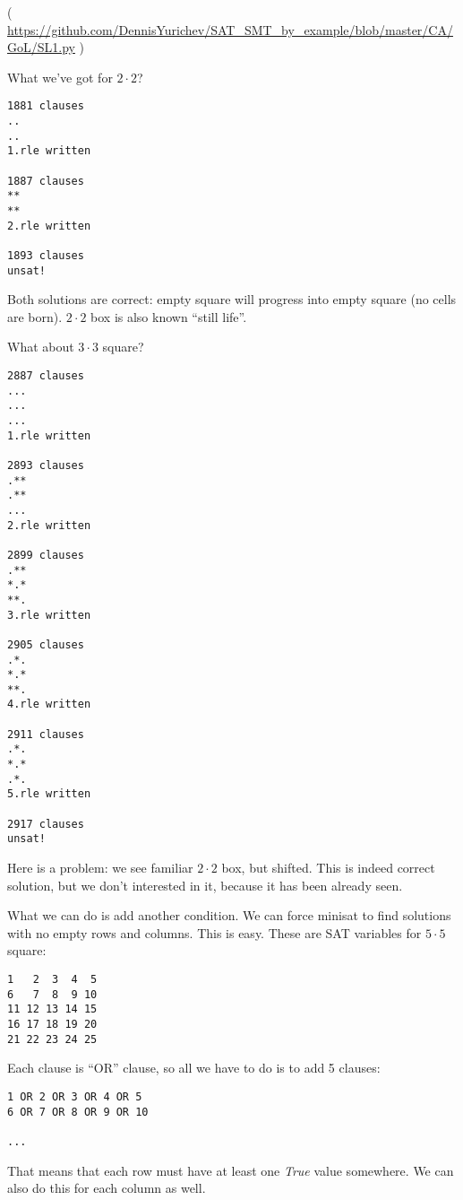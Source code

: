 

( \url{https://github.com/DennisYurichev/SAT_SMT_by_example/blob/master/CA/GoL/SL1.py} )

What we've got for $2 \cdot 2$?

\begin{lstlisting}
1881 clauses
..
..
1.rle written

1887 clauses
**
**
2.rle written

1893 clauses
unsat!
\end{lstlisting}

Both solutions are correct: empty square will progress into empty square (no cells are born).
$2 \cdot 2$ box is also known ``still life''.

What about $3 \cdot 3$ square?

\begin{lstlisting}
2887 clauses
...
...
...
1.rle written

2893 clauses
.**
.**
...
2.rle written

2899 clauses
.**
*.*
**.
3.rle written

2905 clauses
.*.
*.*
**.
4.rle written

2911 clauses
.*.
*.*
.*.
5.rle written

2917 clauses
unsat!
\end{lstlisting}

Here is a problem: we see familiar $2 \cdot 2$ box, but shifted.
This is indeed correct solution, but we don't interested in it, because it has been already seen.

What we can do is add another condition. We can force minisat to find solutions with no empty rows and columns.
This is easy.
These are SAT variables for $5 \cdot 5$ square:

\begin{lstlisting}
1   2  3  4  5
6   7  8  9 10
11 12 13 14 15
16 17 18 19 20
21 22 23 24 25
\end{lstlisting}

Each clause is ``OR'' clause, so all we have to do is to add 5 clauses:

\begin{lstlisting}
1 OR 2 OR 3 OR 4 OR 5
6 OR 7 OR 8 OR 9 OR 10

...

\end{lstlisting}

That means that each row must have at least one \textit{True} value somewhere.
We can also do this for each column as well.

